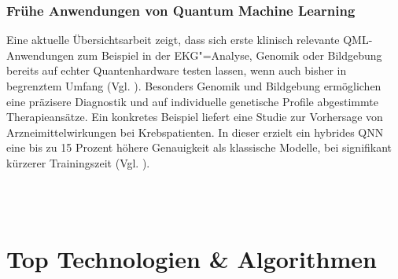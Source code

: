 \subsubsection*{Frühe Anwendungen von Quantum Machine Learning}
Eine aktuelle Übersichtsarbeit zeigt, dass sich erste klinisch relevante QML-Anwendungen zum Beispiel in der EKG"=Analyse, Genomik oder Bildgebung bereits auf echter Quantenhardware testen lassen, wenn auch bisher in begrenztem Umfang (Vgl. \cite{gupta_systematic_2025}). Besonders Genomik und Bildgebung ermöglichen eine präzisere Diagnostik und auf individuelle genetische Profile abgestimmte Therapieansätze. Ein konkretes Beispiel liefert eine Studie zur Vorhersage von Arzneimittelwirkungen bei Krebspatienten. In dieser erzielt ein hybrides QNN eine bis zu 15 Prozent höhere Genauigkeit als klassische Modelle, bei signifikant kürzerer Trainingszeit (Vgl. \cite{sagingalieva_hybrid_2023}).\\
\\
\begin{table}[ht]
\centering
\renewcommand{\arraystretch}{1.3}
\caption{Anwendungsfelder des Quantencomputings in der Medizin und Pharmazie}
\label{tab:qc_medizin}
\end{table}
\\


\section{Top Technologien \& Algorithmen}

